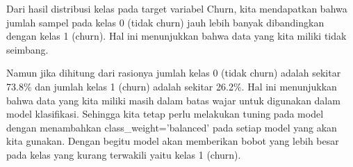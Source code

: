 Dari hasil distribusi kelas pada target variabel Churn, kita mendapatkan bahwa jumlah sampel pada kelas 0 (tidak churn) jauh lebih banyak dibandingkan dengan kelas 1 (churn). Hal ini menunjukkan bahwa data yang kita miliki tidak seimbang.

Namun jika dihitung dari rasionya  jumlah kelas 0 (tidak churn) adalah sekitar 73.8\% dan jumlah kelas 1 (churn) adalah sekitar 26.2\%. Hal ini menunjukkan bahwa data yang kita miliki masih dalam batas wajar untuk digunakan dalam model klasifikasi. Sehingga kita tetap perlu melakukan tuning pada model dengan menambahkan class\_weight='balanced' pada setiap model yang akan kita gunakan. Dengan begitu model akan memberikan bobot yang lebih besar pada kelas yang kurang terwakili yaitu kelas 1 (churn).

\newpage

